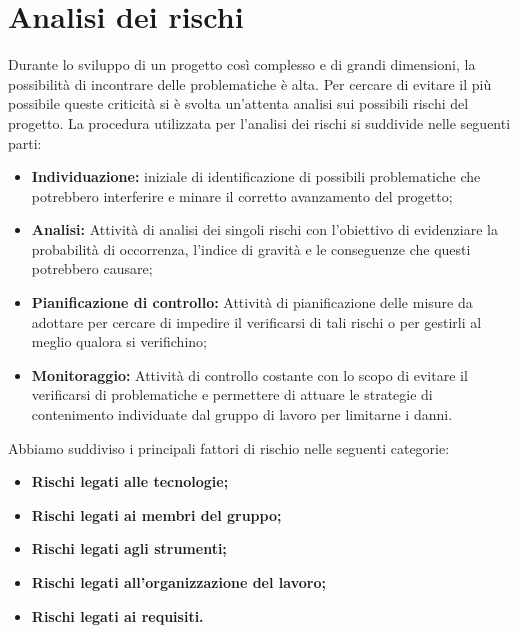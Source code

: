 \section{Analisi dei rischi}
\label{analisi_dei_rischi}
Durante lo sviluppo di un progetto così complesso e di grandi dimensioni, la possibilità di incontrare delle problematiche è alta. Per cercare di evitare il più possibile queste criticità si è svolta un'attenta analisi sui possibili rischi del progetto. La procedura utilizzata per l'analisi dei rischi si suddivide nelle seguenti parti:
\begin{itemize}
    \item \textbf{Individuazione:}  iniziale di identificazione di possibili problematiche che potrebbero interferire e minare il corretto avanzamento del progetto;
    \item \textbf{Analisi:} Attività di analisi dei singoli rischi con l'obiettivo di evidenziare la probabilità di occorrenza, l'indice di gravità e le conseguenze che questi potrebbero causare;
    \item \textbf{Pianificazione di controllo:} Attività di pianificazione delle misure da adottare per cercare di impedire il verificarsi di tali rischi o per gestirli al meglio qualora si verifichino;
    \item \textbf{Monitoraggio:} Attività di controllo costante con lo scopo di evitare il verificarsi di problematiche e permettere di attuare le strategie di contenimento individuate dal gruppo di lavoro per limitarne i danni.
\end{itemize}
Abbiamo suddiviso i principali fattori di rischio nelle seguenti categorie:
\begin{itemize}
    \item \textbf{Rischi legati alle tecnologie;}
    \item \textbf{Rischi legati ai membri del gruppo;}
    \item \textbf{Rischi legati agli strumenti;}
    \item \textbf{Rischi legati all'organizzazione del lavoro;}
    \item \textbf{Rischi legati ai requisiti.}
\end{itemize}

\renewcommand{\arraystretch}{1.5}

\newpage


\newpage

%


\newpage


\newpage
